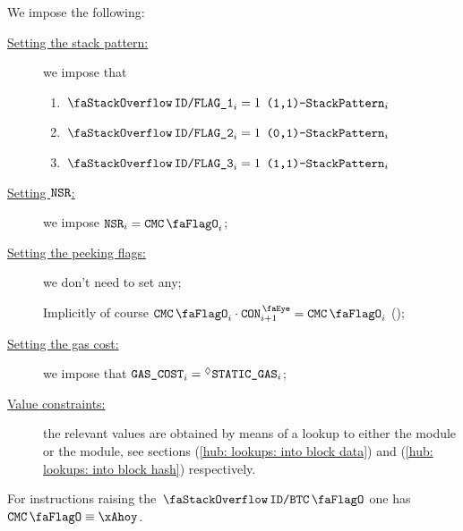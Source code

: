 \begin{center}
\end{center}
We impose the following:
\begin{description}
	\item[\underline{Setting the stack pattern:}]
		we impose that
	\begin{enumerate}
		\item \If $\decFlag{1} _{i} = 1$ \Then $\texttt{(1,1)-}\texttt{StackPattern}  _{i}$
		\item \If $\decFlag{2} _{i} = 1$ \Then $\texttt{(0,1)-}\texttt{StackPattern} _{i}$
		\item \If $\decFlag{3} _{i} = 1$ \Then $\texttt{(1,1)-}\texttt{StackPattern}  _{i}$
	\end{enumerate}
	\item[\underline{Setting $\texttt{NSR}$:}]
		we impose $\nonStackRows_{i} = \cmc_{i}$;
	\item[\underline{Setting the peeking flags:}]
		we don't need to set any;

		\saNote{}
		Implicitly of course $\cmc_{i} \cdot \peekContext_{i + 1} = \cmc_{i}$ (\trash);
	\item[\underline{Setting the gas cost:}]
		we impose that $\texttt{GAS}\texttt{\_COST}_{i} = \prescript{\lozenge}{}{\texttt{STATIC\_GAS}}_{i}$;
	\item[\underline{Value constraints:}]
		the relevant values are obtained by means of a lookup to either the \btcMod{} module or the \blockHashMod{} module,
		see sections
		(\ref{hub: lookups: into block data}) and
		(\ref{hub: lookups: into block hash}) respectively.
\end{description}
\saNote{}
For instructions raising the $\stackDecBtcFlag$ one has $\cmc \equiv \xAhoy$.
